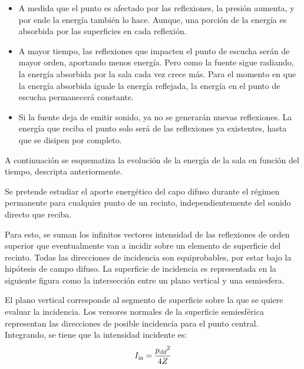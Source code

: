 \documentclass[a5paper,12pt,twoside]{book}
\begin{document}
\begin{itemize}
    \item {}
    A medida que el punto es afectado por las reflexiones, la presión aumenta, y por ende la energía también lo hace.
    Aunque, una porción de la energía es absorbida por las superficies en cada reflexión.
    
    \item {}
    A mayor tiempo, las reflexiones que impacten el punto de escucha serán de mayor orden, aportando menos energía.
    Pero como la fuente sigue radiando, la energía absorbida por la sala cada vez crece más.
    Para el momento en que la energía absorbida iguale la energía reflejada, la energía en el punto de escucha permanecerá constante.
    
    \item {}
    Si la fuente deja de emitir sonido, ya no se generarán nuevas reflexiones.
    La energía que reciba el punto solo será de las reflexiones ya existentes, hasta que se disipen por completo.
\end{itemize}

A continuación se esquematiza la evolución de la energía de la sala en función del tiempo, descripta anteriormente.

\begin{center}
    \def\svgwidth{0.5\linewidth}
    
\end{center}

Se pretende estudiar el aporte energético del capo difuso durante el régimen permanente para cualquier punto de un recinto, independientemente del sonido directo que reciba.

Para esto, se suman los infinitos vectores intensidad de las reflexiones de orden superior que eventualmente van a incidir sobre un elemento de superficie del recinto.
Todas las direcciones de incidencia son equiprobables, por estar bajo la hipótesis de campo difuso.
La superficie de incidencia es representada en la siguiente figura como la intersección entre un plano vertical y una semiesfera.

\begin{center}
    \def\svgwidth{0.6\linewidth}
    
\end{center}

El plano vertical corresponde al segmento de superficie sobre la que se quiere evaluar la incidencia.
Los versores normales de la superficie semiesférica representan las direcciones de posible incidencia para el punto central.
Integrando, se tiene que la intensidad incidente es: %
\begin{equation} 
    {{I}_\textsl{{in}}} = \frac{{{p}_\textsl{{dif}}}^2}{4 Z}
    \label{eqn:Idiffuse}
\end{equation}
\end{document}
